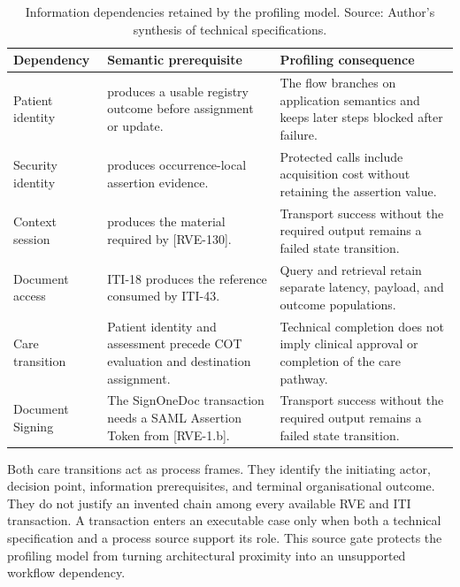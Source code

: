 \begingroup
\renewcommand{\arraystretch}{1.0}
\begin{table}[H]
    \centering
    \caption[Information dependencies in the profiling model]{Information
    dependencies retained by the profiling model. Source: Author's
    synthesis of technical specifications.}
    \label{tab:process-dependencies}
    \small
    \begin{tabular}{|>{\raggedright\arraybackslash}p{2.8cm}|>{\raggedright\arraybackslash}p{4.1cm}|>{\raggedright\arraybackslash}p{4.7cm}|}
    \hline
    \rowcolor{veryPeri!18}
    \textbf{Dependency} & \textbf{Semantic prerequisite} & \textbf{Profiling consequence} \\
    \hline
    \rowcolor{tableGray}
    Patient identity & [RVE-54] produces a usable registry outcome before assignment or update. & The flow branches on application semantics and keeps later steps blocked after failure. \\
    \hline
    Security identity & [RVE-1.b] produces occurrence-local assertion evidence. & Protected calls include acquisition cost without retaining the assertion value. \\
    \hline
    \rowcolor{tableGray}
    Context session & [RVE-121] produces the material required by [RVE-130]. & Transport success without the required output remains a failed state transition. \\
    \hline
    Document access & ITI-18 produces the reference consumed by ITI-43. & Query and retrieval retain separate latency, payload, and outcome populations. \\
    \hline
    \rowcolor{tableGray}
    Care transition & Patient identity and assessment precede COT evaluation and destination assignment. & Technical completion does not imply clinical approval or completion of the care pathway. \\
    \hline
    \rowcolor{tableGray}
    Document Signing & The SignOneDoc transaction needs a SAML Assertion Token from [RVE-1.b]. &  Transport success without the required output remains a failed state transition. \\
   \hline
\end{tabular}
\end{table}
\endgroup

\noindent Both care transitions act as process frames. They identify the
initiating actor, decision point, information
prerequisites, and terminal organisational outcome. They do not justify an
invented chain among every available RVE and ITI transaction. A transaction
enters an executable case only when both a technical specification and a process
source support its role. This source gate protects the profiling model from
turning architectural proximity into an unsupported workflow dependency.

